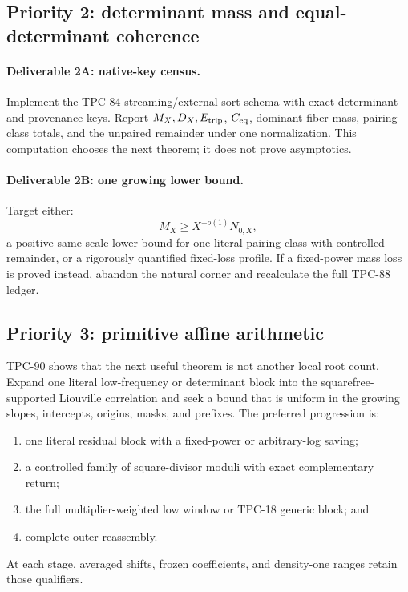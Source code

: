 \subsection{Priority 2: determinant mass and equal-determinant
coherence}

\paragraph{Deliverable 2A: native-key census.}
Implement the TPC-84 streaming/external-sort schema with exact
determinant and provenance keys.  Report \(M_X,D_X,E_{\rm trip}\),
\(C_{\rm eq}\), dominant-fiber mass, pairing-class totals, and the
unpaired remainder under one normalization.  This computation chooses
the next theorem; it does not prove asymptotics.

\paragraph{Deliverable 2B: one growing lower bound.}
Target either:
\[
 M_X\ge X^{-o(1)}N_{0,X},
\]
a positive same-scale lower bound for one literal pairing class with
controlled remainder, or a rigorously quantified fixed-loss profile.
If a fixed-power mass loss is proved instead, abandon the natural
corner and recalculate the full TPC-88 ledger.

\subsection{Priority 3: primitive affine arithmetic}

TPC-90 shows that the next useful theorem is not another local root
count.  Expand one literal low-frequency or determinant block into
the squarefree-supported Liouville correlation and seek a bound that
is uniform in the growing slopes, intercepts, origins, masks, and
prefixes.  The preferred progression is:
\begin{enumerate}[label=(\roman*),leftmargin=2.2em]
\item one literal residual block with a fixed-power or arbitrary-log
  saving;
\item a controlled family of square-divisor moduli with exact
  complementary return;
\item the full multiplier-weighted low window or TPC-18 generic
  block; and
\item complete outer reassembly.
\end{enumerate}
At each stage, averaged shifts, frozen coefficients, and density-one
ranges retain those qualifiers.


